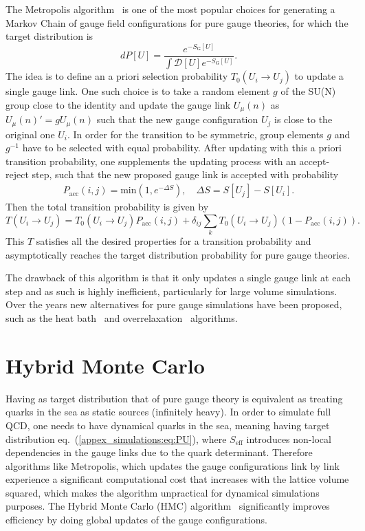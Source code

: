 The Metropolis algorithm~\citep{Metropolis:1953am} is one of the most popular choices for generating a Markov Chain of gauge field configurations for pure gauge theories, for which the target distribution is
\begin{equation}
dP[U]=\frac{e^{-S_{\textrm{G}}[U]}}{\int\mathcal{D}[U]e^{-S_{\textrm{G}}[U]}}.
\end{equation}
The idea is to define an a priori selection probability $T_0(U_i\rightarrow U_j)$ to update a single gauge link. One such choice is to take a random element $g$ of the SU(N) group close to the identity and update the gauge link $U_{\mu}(n)$ as $U_{\mu}(n)'=gU_{\mu}(n)$ such that the new gauge configuration $U_j$ is close to the original one $U_i$. In order for the transition to be symmetric, group elements $g$ and $g^{-1}$ have to be selected with equal probability. After updating with this a priori transition probability, one supplements the updating process with an accept-reject step, such that the new proposed gauge link is accepted with probability
\begin{gather}
P_{\textrm{acc}}(i,j)=\textrm{min}\left(1,e^{-\Delta S}\right), \quad \Delta S=S[U_j]-S[U_i].
\end{gather}
Then the total transition probability is given by 
\begin{equation}
T(U_i\rightarrow U_j)=T_0(U_i\rightarrow U_j)P_{\textrm{acc}}(i,j)+\delta_{ij}\sum_kT_0(U_i\rightarrow U_j)(1-P_{\textrm{acc}}(i,j)).
\end{equation}
This $T$ satisfies all the desired properties for a transition probability and asymptotically reaches the target distribution probability for pure gauge theories.

The drawback of this algorithm is that it only updates a single gauge link at each step and as such is highly inefficient, particularly for large volume simulations. Over the years new alternatives for pure gauge simulations have been proposed, such as the heat bath~\citep{Creutz:1980zw} and overrelaxation~\citep{Adler:1981sn,Creutz:1987xi} algorithms.

\section{Hybrid Monte Carlo}

Having as target distribution that of pure gauge theory is equivalent as treating quarks in the sea as static sources (infinitely heavy). In order to simulate full QCD, one needs to have dynamical quarks in the sea, meaning having target distribution eq.~(\ref{appex_simulations:eq:PU}), where $S_{\textrm{eff}}$ introduces non-local dependencies in the gauge links due to the quark determinant. Therefore algorithms like Metropolis, which updates the gauge configurations link by link experience a significant computational cost that increases with the lattice volume squared, which makes the algorithm unpractical for dynamical simulations purposes. The Hybrid Monte Carlo (HMC) algorithm~\citep{Duane:1987de,Gottlieb:1987mq} significantly improves efficiency by doing global updates of the gauge configurations.

